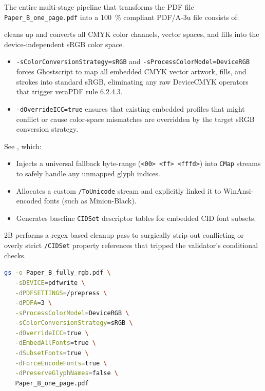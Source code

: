\documentclass[12pt, twoside]{article}
\newcommand{\fname}[1]{\texttt{#1}}
\begin{document}
The entire multi-stage pipeline that transforms the \gls{PDF} file  \fname{Paper\_B\_one\_page.pdf} into a \qty{100}{\percent} compliant PDF/A-3u file consists of:
\begin{description}[style=nextline, labelwidth=\widthof{\textbf{Disadvantage}}, leftmargin=!]

\item [Ghostscript]  cleans up and converts all CMYK color channels, vector spaces, and fills into the device-independent sRGB color space.
\begin{itemize}
    \item \texttt{-sColorConversionStrategy=sRGB} and \texttt{-sProcessColorModel=DeviceRGB} forces Ghostscript to map all embedded CMYK vector artwork, fills, and strokes into standard sRGB, eliminating any raw DeviceCMYK operators that trigger veraPDF rule 6.2.4.3.

    \item \texttt{-dOverrideICC=true} ensures that existing embedded profiles that might conflict or cause color-space mismatches are overridden by the target sRGB conversion strategy.
\end{itemize}


\item[Python Part 1] See , which:
\begin{itemize}
    \item Injects a universal fallback byte-range (\texttt{<00> <ff> <fffd>}) into \texttt{CMap} streams to safely handle any unmapped glyph indices.

    \item Allocates a custom \texttt{/ToUnicode} stream and explicitly linked it to WinAnsi-encoded fonts (such as Minion-Black).

    \item Generates baseline \texttt{CIDSet} descriptor tables for embedded CID font subsets.
\end{itemize}

\item[Python Part 1] 2B performs a regex-based cleanup pass to surgically strip out conflicting or overly strict \texttt{/CIDSet} property references that tripped the validator's conditional checks.
\end{description}

\begin{lstlisting}[language={bash}, caption={Using ghostscript to correct the Paper\_B PDF file},label=lst:cleanPaperB]
gs -o Paper_B_fully_rgb.pdf \
   -sDEVICE=pdfwrite \
   -dPDFSETTINGS=/prepress \
   -dPDFA=3 \
   -sProcessColorModel=DeviceRGB \
   -sColorConversionStrategy=sRGB \
   -dOverrideICC=true \
   -dEmbedAllFonts=true \
   -dSubsetFonts=true \
   -dForceEncodeFonts=true \
   -dPreserveGlyphNames=false \
   Paper_B_one_page.pdf
\end{lstlisting}
\end{document}
